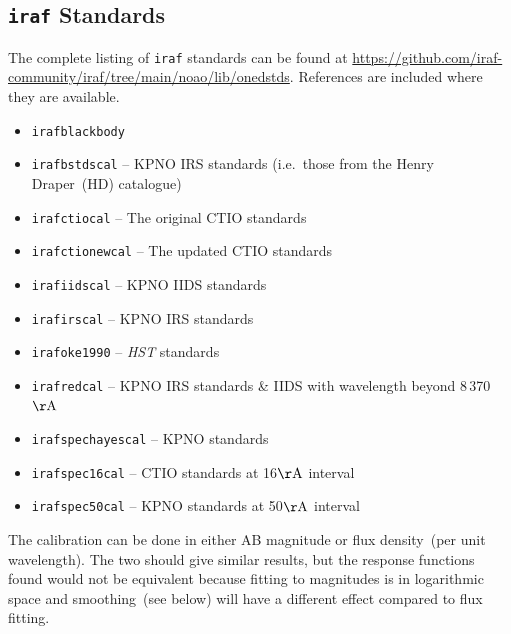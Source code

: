\documentclass[linenumbers, twocolumn]{aastex631}
\begin{document}
\subsection*{\texttt{iraf} Standards}
The complete listing of \texttt{iraf} standards can be found at
\url{https://github.com/iraf-community/iraf/tree/main/noao/lib/onedstds}.
References are included where they are available.

\begin{itemize}
    \item \texttt{irafblackbody}
    \item \texttt{irafbstdscal} -- KPNO IRS standards (i.e.\ those from the Henry Draper~(HD) catalogue)
    \item \texttt{irafctiocal} -- The original CTIO standards \citet{1983MNRAS.204..347S, 1984MNRAS.206..241B}
    \item \texttt{irafctionewcal} -- The updated CTIO standards \citet{1992PASP..104..533H, 1994PASP..106..566H}
    \item \texttt{irafiidscal} -- KPNO IIDS standards \citet{1988ApJ...328..315M}
    \item \texttt{irafirscal} -- KPNO IRS standards \citet{1988ApJ...328..315M}
    \item \texttt{irafoke1990} -- \textit{HST} standards \citet{1990AJ.....99.1621O}
    \item \texttt{irafredcal} -- KPNO IRS standards \& IIDS \citet{1988ApJ...328..315M} with wavelength beyond 8\,370\,$\mathrm{\AA}$
    \item \texttt{irafspechayescal} -- KPNO standards \citet{1988ApJ...328..315M}
    \item \texttt{irafspec16cal} -- CTIO standards \citet{1992PASP..104..533H, 1994PASP..106..566H} at 16$\mathrm{\AA}$ interval
    \item \texttt{irafspec50cal} -- KPNO standards \citet{1988ApJ...328..315M, 1990ApJ...358..344M} at 50$\mathrm{\AA}$ interval
\end{itemize}



The calibration can be done in either AB magnitude or
flux density~(per unit wavelength). The two should give similar
results, but the response functions found would not be equivalent
because fitting to magnitudes is in logarithmic space and smoothing~(see
below) will have a different effect compared to flux fitting.

\end{document}
